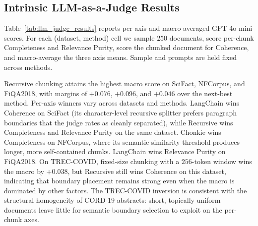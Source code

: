 \subsection{Intrinsic LLM-as-a-Judge Results}
\label{sec:intrinsic_results}
Table~\ref{tab:llm_judge_results} reports per-axis and macro-averaged GPT-4o-mini scores. For each (dataset, method) cell we sample $250$ documents, score per-chunk Completeness and Relevance Purity, score the chunked document for Coherence, and macro-average the three axis means. Sample and prompts are held fixed across methods.

Recursive chunking attains the highest macro score on SciFact, NFCorpus, and FiQA2018, with margins of $+0.076$, $+0.096$, and $+0.046$ over the next-best method. Per-axis winners vary across datasets and methods. LangChain wins Coherence on SciFact (its character-level recursive splitter prefers paragraph boundaries that the judge rates as cleanly separated), while Recursive wins Completeness and Relevance Purity on the same dataset. Chonkie wins Completeness on NFCorpus, where its semantic-similarity threshold produces longer, more self-contained chunks. LangChain wins Relevance Purity on FiQA2018. On TREC-COVID, fixed-size chunking with a $256$-token window wins the macro by $+0.038$, but Recursive still wins Coherence on this dataset, indicating that boundary placement remains strong even when the macro is dominated by other factors. The TREC-COVID inversion is consistent with the structural homogeneity of CORD-19 abstracts: short, topically uniform documents leave little for semantic boundary selection to exploit on the per-chunk axes.

